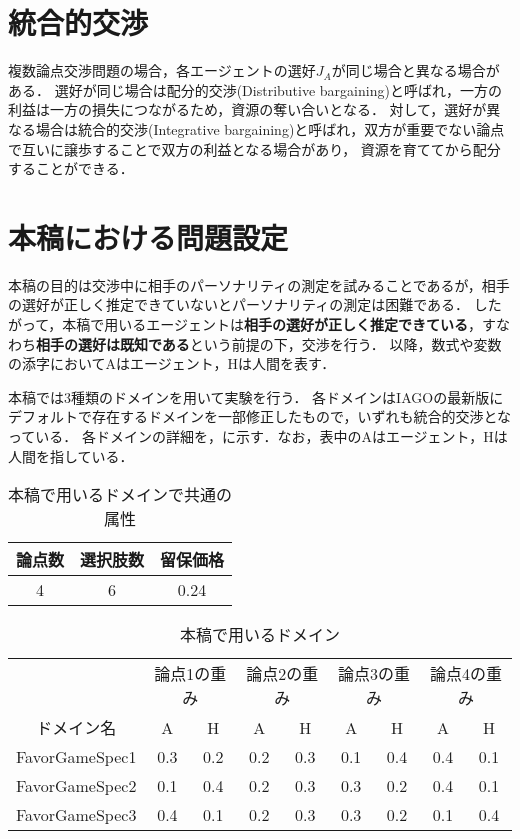 \section{統合的交渉}
複数論点交渉問題の場合，各エージェントの選好$J_A$が同じ場合と異なる場合がある．
選好が同じ場合は配分的交渉(Distributive bargaining)と呼ばれ，一方の利益は一方の損失につながるため，資源の奪い合いとなる．
対して，選好が異なる場合は統合的交渉(Integrative bargaining)と呼ばれ，双方が重要でない論点で互いに譲歩することで双方の利益となる場合があり，
資源を育ててから配分することができる．

\section{本稿における問題設定}
本稿の目的は交渉中に相手のパーソナリティの測定を試みることであるが，相手の選好が正しく推定できていないとパーソナリティの測定は困難である．
したがって，本稿で用いるエージェントは{\bf 相手の選好が正しく推定できている}，すなわち{\bf 相手の選好は既知である}という前提の下，交渉を行う．
以降，数式や変数の添字においてAはエージェント，Hは人間を表す．

本稿では3種類のドメインを用いて実験を行う．
各ドメインはIAGOの最新版にデフォルトで存在するドメインを一部修正したもので，いずれも統合的交渉となっている．
各ドメインの詳細を，に示す．なお，表中のAはエージェント，Hは人間を指している．

\begin{table}[b]
  \centering
  \caption{本稿で用いるドメインで共通の属性}
  \begin{tabular}{ccc} \toprule
      論点数 & 選択肢数 & 留保価格 \\ \midrule
      4 & 6 & 0.24 \\ \bottomrule
  \end{tabular}
  \label{tab:common-domain}
\end{table}

\begin{table}[tb]
  \centering
  \caption{本稿で用いるドメイン}
  \begin{tabular}{ccccccccc} \toprule
      & \multicolumn{2}{c}{論点1の重み} & \multicolumn{2}{c}{論点2の重み} & \multicolumn{2}{c}{論点3の重み} & \multicolumn{2}{c}{論点4の重み} \\
      ドメイン名  & A & H & A & H & A & H & A & H \\ \midrule
      FavorGameSpec1 & 0.3 & 0.2 & 0.2 & 0.3 & 0.1 & 0.4 & 0.4 & 0.1 \\
      FavorGameSpec2 & 0.1 & 0.4 & 0.2 & 0.3 & 0.3 & 0.2 & 0.4 & 0.1 \\
      FavorGameSpec3 & 0.4 & 0.1 & 0.2 & 0.3 & 0.3 & 0.2 & 0.1 & 0.4 \\ \bottomrule
  \end{tabular}
  \label{tab:domain}
\end{table}

